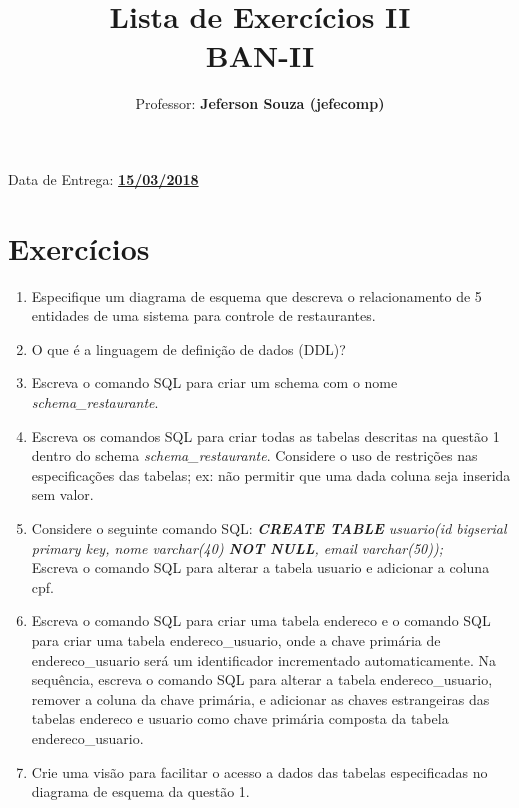\documentclass[12pt]{article}
\title{Lista de Exercícios II\\
BAN-II}
\author{Professor: \textbf{Jeferson Souza (jefecomp)}}
\begin{document}
\date{}

\maketitle

\begin{center}
Data de Entrega: \textbf{\underline{15/03/2018}}
\end{center}

\section{Exercícios}

\begin{enumerate}
\itemsep 10mm

\item Especifique um diagrama de esquema que descreva o relacionamento de 5 entidades de uma sistema para controle de restaurantes.

\item O que é a linguagem de definição de dados (DDL)?

\item Escreva o comando SQL para criar um schema com o nome \textit{schema\_restaurante}.

\item Escreva os comandos SQL para criar todas as tabelas descritas na questão 1 dentro do schema \textit{schema\_restaurante}. Considere o uso de restrições nas especificações das tabelas; ex: não permitir que uma dada coluna seja inserida sem valor.

\item Considere o seguinte comando SQL: \textit{\textbf{CREATE TABLE} usuario(id bigserial primary key, nome varchar(40) \textbf{NOT NULL}, email varchar(50));}\\[-1mm]

Escreva o comando SQL para alterar a tabela usuario e adicionar a coluna cpf.

\item Escreva o comando SQL para criar uma tabela endereco e o comando SQL para criar uma tabela endereco\_usuario, onde a chave primária de endereco\_usuario será um identificador incrementado automaticamente. Na sequência, escreva o comando SQL para alterar a tabela endereco\_usuario, remover a coluna da chave primária, e adicionar as chaves estrangeiras das tabelas endereco e usuario como chave primária composta da tabela endereco\_usuario.

\item Crie uma visão para facilitar o acesso a dados das tabelas especificadas no diagrama de esquema da questão 1. 
\end{enumerate}
\end{document}
